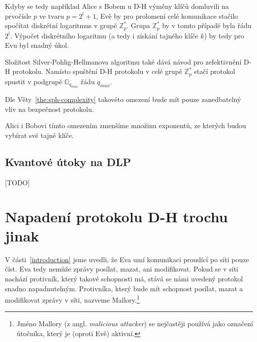 \documentclass[
  program=infoi,
  biblatex,
  figures=false,
  glossaries,
  index
]{kidiplom}
\begin{document}
            \medskip

            Kdyby se tedy například Alice s Bobem u D-H výměny klíčů domluvili na prvočísle $p$ ve tvaru $p = 2^l + 1$,
            Evě by pro prolomení celé komunikace stačilo spočítat diskrétní logaritmus v grupě $\mathbb{Z}^*_p$.
            Grupa $\mathbb{Z}^*_p$ by v tomto případě byla řádu $2^l$.
            Výpočet diskrétního logaritmu (a tedy i získání tajného klíče $k$) by tedy pro Evu byl snadný úkol. 


            \begin{remark}\label{rem:diffie-hellman-improved}
                
                Složitost Silver-Pohlig-Hellmanova algoritmu také dává návod pro zefektivnění D-H protokolu.
                Namísto spuštění D-H protokolu v celé grupě $\mathbb{Z}^*_p$ stačí protokol spustit
                v podgrupě $\mathbb{G}_{q_{max}}$ řádu $q_{max}$.
            
                Dle Věty~\ref{the:sph-complexity} takovéto omezení bude mít pouze zanedbatelný vliv na bezpečnost protokolu.

                Alici i Bobovi tímto omezením zmenšíme množinu exponentů, ze kterých budou vybírat své tajné klíče.

            \end{remark}


        \subsection{Kvantové útoky na DLP}

            [TODO]
    


\section{Napadení protokolu D-H trochu jinak}


    V části~\ref{introduction} jsme uvedli, že Eva umí komunikaci proudící po síti pouze číst. Eva tedy nemůže zprávy posílat, mazat, ani modifikovat.
    Pokud se v síti nachází protivník, který takové schopnosti má, stává se námi uvedený protokol snadno napadnutelným. Protivníka, který bude mít
    schopnost posílat, mazat a modifikovat zprávy v síti, nazveme Mallory.\footnote{Jméno Mallory (z angl. \emph{malicious attacker}) se nejčastěji používá jako
    označení útočníka, který je (oproti Evě) aktivní.}
\end{document}
